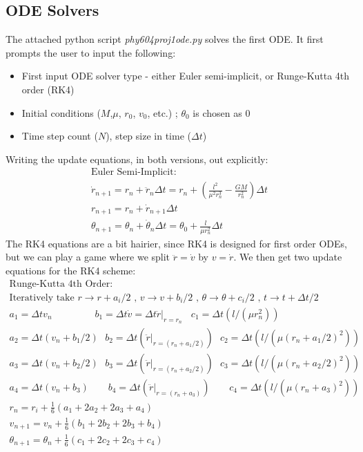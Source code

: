 \documentclass{article}
\begin{document}
\subsection{ODE Solvers}
The attached python script \textit{phy604proj1\textunderscore ode.py} solves the first ODE. It first prompts the user to input the following:
\begin{itemize}
    \item First input ODE solver type - either Euler semi-implicit, or Runge-Kutta 4th order (RK4)
    \item Initial conditions ($M$,$\mu$, $r_0$, $v_0$, etc.) ; $\theta_0$ is chosen as 0
    \item Time step count ($N$), step size in time ($\Delta t$)
\end{itemize}
Writing the update equations, in both versions, out explicitly:
\begin{gather}
    \text{Euler Semi-Implicit:} \\
    \dot{r}_{n+1}=r_n+\ddot{r}_n \Delta t =r_n+(\frac{l^2}{\mu^2 r_n^3}-\frac{GM}{r_n^2})\Delta t\\
    r_{n+1}=r_n+\dot{r}_{n+1}\Delta t \\
    \theta_{n+1}=\theta_n+\dot{\theta}_n\Delta t = \theta_0+\frac{l}{\mu r_n^2} \Delta t 
\end{gather}
The RK4 equations are a bit hairier, since RK4 is designed for first order ODEs, but we can play a game where we split $\ddot{r}=\dot{v}$ by $v=\dot{r}$. We then get two update equations for the RK4 scheme:
\begin{gather}
    \text{Runge-Kutta 4th Order:} \\
    \text{Iteratively take }r\rightarrow r+a_i/2\text{ , }v \rightarrow v+b_i/2 \text{ , }\theta \rightarrow \theta+c_i/2\text{ , } t \rightarrow t+\Delta t/2 \\
    a_1=\Delta t v_n \: \:\:\:\:\:\:\:\:\:\:\:\:\:\:\:\:\:\:\: b_1=\Delta t \dot{v}=\Delta t \ddot{r}|_{r=r_n} \:\:\:\: c_1=\Delta t(l/(\mu r_n^2))\:\:\:\:\:\:\:\:\:\:\:\:\:\:\:\:\:\:\: \\
    a_2=\Delta t(v_n+b_1/2) \:\:\: b_2=\Delta t(\ddot{r}|_{r={(r_n+a_1/2)}}) \:\:\: c_2 = \Delta t (l/(\mu (r_n+a_1/2)^2))\\
    a_3=\Delta t(v_n+b_2/2) \:\:\: b_3=\Delta t(\ddot{r}|_{r={(r_n+a_2/2)}})\:\:\: c_3 = \Delta t (l/(\mu (r_n+a_2/2)^2)) \\
    a_4=\Delta t(v_n+b_3) \:\:\:\:\:\:\:\:\: b_4=\Delta t(\ddot{r}|_{r={(r_n+a_3)}}) \:\:\:\:\:\:\:\:\: c_4 = \Delta t (l/(\mu (r_n+a_3)^2))\\
    r_n=r_i+\frac{1}{6}(a_1+2a_2+2a_3+a_4) \\
    v_{n+1}=v_n+\frac{1}{6}(b_1+2b_2+2b_3+b_4) \\
    \theta_{n+1}=\theta_n+\frac{1}{6}(c_1+2c_2+2c_3+c_4)
\end{gather}
\end{document}
